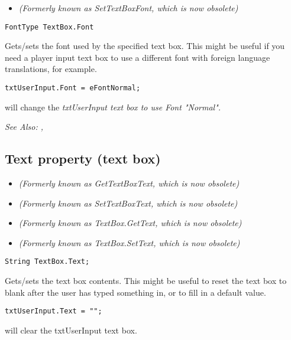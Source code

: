 \begin{itemize}
\item \it{(Formerly known as SetTextBoxFont, which is now obsolete)}
\end{itemize}

\begin{verbatim}
FontType TextBox.Font
\end{verbatim}

Gets/sets the font used by the specified text box.
This might be useful if you need a player input text box to use a different
font with foreign language translations, for example.

\begin{verbatim}
txtUserInput.Font = eFontNormal;
\end{verbatim}
will change the \it{txtUserInput} text box to use Font "Normal".

\it{See Also:} , 


\subsection{Text property (text box)}\label{TextBox.Text}%

\begin{itemize}
\item \it{(Formerly known as GetTextBoxText, which is now obsolete)}
\item \it{(Formerly known as SetTextBoxText, which is now obsolete)}
\item \it{(Formerly known as TextBox.GetText, which is now obsolete)}
\item \it{(Formerly known as TextBox.SetText, which is now obsolete)}
\end{itemize}

\begin{verbatim}
String TextBox.Text;
\end{verbatim}

Gets/sets the text box contents. This might be useful to reset
the text box to blank after the user has typed something in, or to fill
in a default value.

\begin{verbatim}
txtUserInput.Text = "";
\end{verbatim}
will clear the txtUserInput text box.

